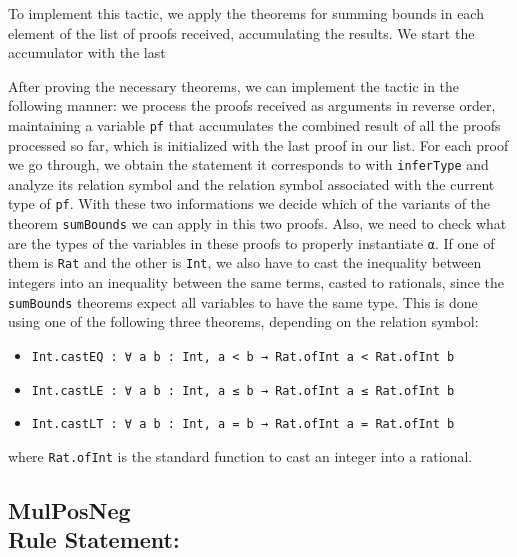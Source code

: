 To implement this tactic, we apply the theorems for summing bounds in each element
of the list of proofs received, accumulating the results. We start the accumulator
with the last

After proving the necessary theorems, we can implement the tactic in the following manner:
we process the proofs received as arguments in reverse order, maintaining a variable \texttt{pf}
that accumulates the combined result of all the proofs processed so far, which is initialized
with the last proof in our list. For each proof we go through, we obtain the statement it corresponds to
with \texttt{inferType} and analyze its relation symbol and the relation symbol associated with the
current type of \texttt{pf}. With these two informations we decide which of the variants of the theorem
\texttt{sumBounds} we can apply in this two proofs. Also, we need to check what are the types of the
variables in these proofs to properly instantiate \texttt{α}. If one of them is \texttt{Rat} and the
other is \texttt{Int}, we also have to cast the inequality between integers into
an inequality between the same terms, casted to rationals, since the \texttt{sumBounds} theorems expect all variables to have the same type. This is done using one of the
following three theorems, depending on the relation symbol:

\begin{itemize}
  \item \texttt{Int.castEQ : ∀ {a b : Int}, a < b → Rat.ofInt a < Rat.ofInt b}
  \item \texttt{Int.castLE : ∀ {a b : Int}, a ≤ b → Rat.ofInt a ≤ Rat.ofInt b}
  \item \texttt{Int.castLT : ∀ {a b : Int}, a = b → Rat.ofInt a = Rat.ofInt b}
\end{itemize}

where \texttt{Rat.ofInt} is the standard function to cast an integer into a rational.

\subsection*{MulPosNeg\\Rule Statement:}



